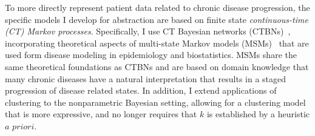 To more directly represent patient data related to chronic disease progression, the specific models I develop for abstraction are based on finite state \emph{continuous-time (CT) Markov processes}.    Specifically, I use CT Bayesian networks (CTBNs)~\cite{Nodelman02}, incorporating theoretical aspects of multi-state Markov models (MSMs)~\cite{Jackson10} that are used form disease modeling in epidemiology and biostatistics.  MSMs share the same theoretical foundations as CTBNs and are based on domain knowledge that many chronic diseases have a natural interpretation that results in a staged progression of disease related states. In addition, I extend applications of clustering to the nonparametric Bayesian setting, allowing for a clustering model that is more expressive, and no longer requires that $k$ is established by a heuristic $a$ $priori$.






